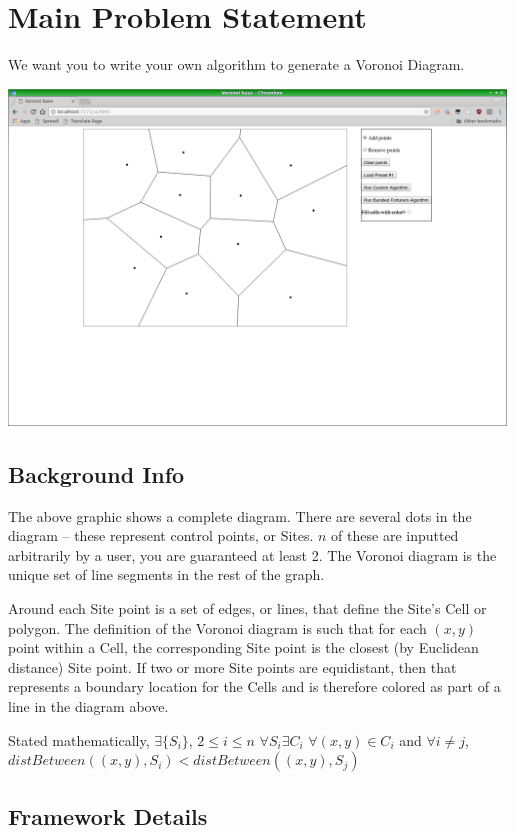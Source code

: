 \documentclass[12pt]{article}
\newcommand{\nl}{\newline}
\begin{document}
\section*{Main Problem Statement}

We want you to write your own algorithm to generate a Voronoi Diagram. \nl

\includegraphics[width=0.99\textwidth]{screenshot.png}

\subsection*{Background Info}

The above graphic shows a complete diagram. There are several dots in the
diagram -- these represent control points, or Sites. $n$ of these are inputted
arbitrarily by a user, you are guaranteed at least 2. The Voronoi diagram is
the unique set of line segments in the rest of the graph.

Around each Site point is a set of edges, or lines, that define the Site's
Cell or polygon. The definition of the Voronoi diagram is such that for each
$(x, y)$ point within a Cell, the corresponding Site point is the closest (by
Euclidean distance) Site point. If two or more Site points are equidistant,
then that represents a boundary location for the Cells and is therefore
colored as part of a line in the diagram above.

Stated mathematically,\nl\nl
$\exists \{S_i\}$, $2 \leq i \leq n$ \nl
$\forall S_i \exists C_i$ \nl
$\forall (x,y) \in C_i$ and $\forall i \neq j$, $distBetween((x,y), S_i) < distBetween((x,y), S_j)$

\subsection*{Framework Details}
\end{document}
